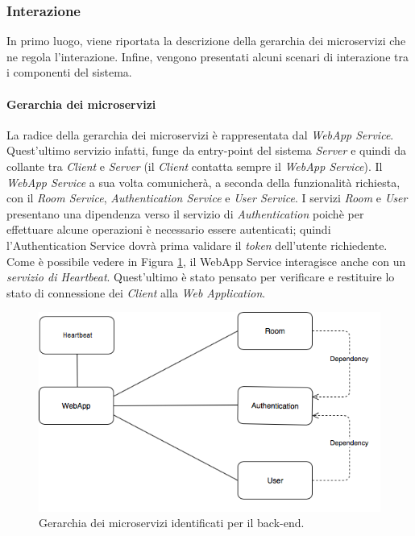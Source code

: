 \subsubsection{Interazione}
In primo luogo, viene riportata la descrizione della gerarchia dei microservizi che ne regola l'interazione. Infine, vengono presentati alcuni scenari di interazione tra i componenti del sistema.
\paragraph{Gerarchia dei microservizi}
La radice della gerarchia dei microservizi è rappresentata dal \textit{WebApp Service}. Quest'ultimo servizio infatti, funge da entry-point del sistema \textit{Server} e quindi da collante tra \textit{Client} e \textit{Server} (il \textit{Client} contatta sempre il \textit{WebApp Service}).
Il \textit{WebApp Service} a sua volta comunicherà, a seconda della funzionalità richiesta, con il \textit{Room Service}, \textit{Authentication Service} e \textit{User Service}. I servizi \textit{Room} e \textit{User} presentano una dipendenza verso il servizio di \textit{Authentication} poichè per effettuare alcune operazioni è necessario essere autenticati; quindi l'Authentication Service dovrà prima validare il \textit{token} dell'utente richiedente. Come è possibile vedere in Figura \ref{fig:microservices-hierarchy}, il WebApp Service interagisce anche con un \textit{servizio di Heartbeat}. Quest'ultimo è stato pensato per verificare e restituire lo stato di connessione dei \textit{Client} alla \textit{Web Application}.

\begin{figure}
    \centering
  \includegraphics[width=\linewidth]{images/MicroserviceHierarchy_with_heartbeat.png}
  \caption{Gerarchia dei microservizi identificati per il back-end.}
  \label{fig:microservices-hierarchy}
\end{figure}


